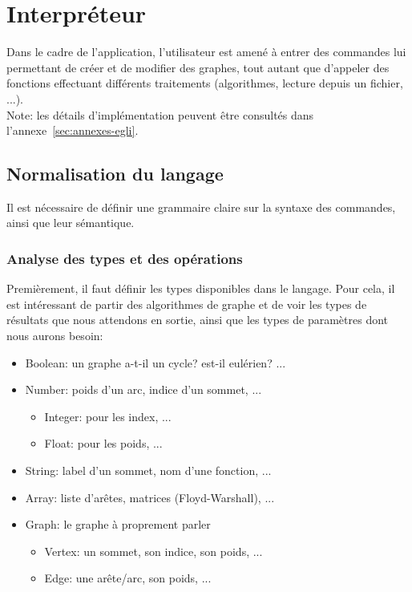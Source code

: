 \documentclass[french]{article}
\begin{document}
	\section{Interpréteur} %
		Dans le cadre de l'application, l'utilisateur est amené à entrer des commandes lui permettant de créer et de modifier des graphes, tout autant que d'appeler des fonctions effectuant différents traitements (algorithmes, lecture depuis un fichier, ...).\\
		
		Note: les détails d'implémentation peuvent être consultés dans l'annexe~\ref{sec:annexes-egli}.
	
		\subsection{Normalisation du langage} 
			Il est nécessaire de définir une grammaire claire sur la syntaxe des commandes, ainsi que leur sémantique.
			
			\subsubsection{Analyse des types et des opérations} 
			\label{subsubsec:analyse-des-types-et-des-operations}
				Premièrement, il faut définir les types disponibles dans le langage. Pour cela, il est intéressant de partir des algorithmes de graphe et de voir les types de résultats que nous attendons en sortie, ainsi que les types de paramètres dont nous aurons besoin:
			
				\begin{itemize}
					\item Boolean: un graphe a-t-il un cycle? est-il eulérien? ...
					\item Number: poids d'un arc, indice d'un sommet, ...
					\begin{itemize}
						\item Integer: pour les index, ...
						\item Float: pour les poids, ...
					\end{itemize}
					\item String: label d'un sommet, nom d'une fonction, ...
					\item Array: liste d'arêtes, matrices (Floyd-Warshall), ...
					\item Graph: le graphe à proprement parler
					\begin{itemize}
						\item Vertex: un sommet, son indice, son poids, ...
						\item Edge: une arête/arc, son poids, ...
					\end{itemize}
				\end{itemize} 
			
\end{document}
